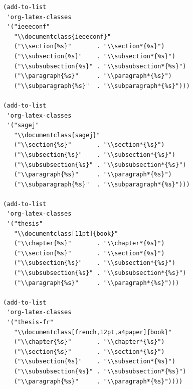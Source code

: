 \documentclass[11pt]{article}
\begin{document}
\begin{verbatim}
  (add-to-list
   'org-latex-classes
   '("ieeeconf"
     "\\documentclass{ieeeconf}"
     ("\\section{%s}"       . "\\section*{%s}")
     ("\\subsection{%s}"    . "\\subsection*{%s}")
     ("\\subsubsection{%s}" . "\\subsubsection*{%s}")
     ("\\paragraph{%s}"     . "\\paragraph*{%s}")
     ("\\subparagraph{%s}"  . "\\subparagraph*{%s}")))

  (add-to-list
   'org-latex-classes
   '("sagej"
     "\\documentclass{sagej}"
     ("\\section{%s}"       . "\\section*{%s}")
     ("\\subsection{%s}"    . "\\subsection*{%s}")
     ("\\subsubsection{%s}" . "\\subsubsection*{%s}")
     ("\\paragraph{%s}"     . "\\paragraph*{%s}")
     ("\\subparagraph{%s}"  . "\\subparagraph*{%s}")))

  (add-to-list
   'org-latex-classes
   '("thesis"
     "\\documentclass[11pt]{book}"
     ("\\chapter{%s}"       . "\\chapter*{%s}")
     ("\\section{%s}"       . "\\section*{%s}")
     ("\\subsection{%s}"    . "\\subsection*{%s}")
     ("\\subsubsection{%s}" . "\\subsubsection*{%s}")
     ("\\paragraph{%s}"     . "\\paragraph*{%s}")))

  (add-to-list
   'org-latex-classes
   '("thesis-fr"
     "\\documentclass[french,12pt,a4paper]{book}"
     ("\\chapter{%s}"       . "\\chapter*{%s}")
     ("\\section{%s}"       . "\\section*{%s}")
     ("\\subsection{%s}"    . "\\subsection*{%s}")
     ("\\subsubsection{%s}" . "\\subsubsection*{%s}")
     ("\\paragraph{%s}"     . "\\paragraph*{%s}"))))


\end{verbatim}
\end{document}
